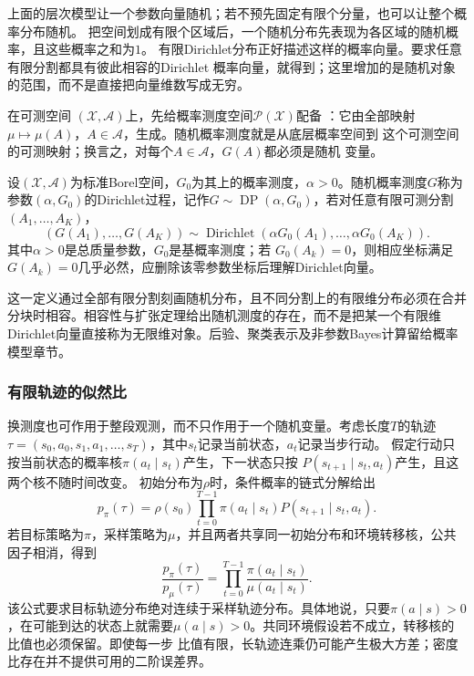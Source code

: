 上面的层次模型让一个参数向量随机；若不预先固定有限个分量，也可以让整个概率分布随机。
把空间划成有限个区域后，一个随机分布先表现为各区域的随机概率，且这些概率之和为$1$。
有限Dirichlet分布正好描述这样的概率向量。要求任意有限分割都具有彼此相容的Dirichlet
概率向量，就得到；这里增加的是随机对象的范围，而不是直接把向量维数写成无穷。
\begin{definition}[随机概率测度]
  \label{def:probability-random-probability-measure}
在可测空间
\((\mathcal X,\mathcal A)\)上，先给概率测度空间\(\mathcal P(\mathcal X)\)配备
：它由全部映射
\(\mu\mapsto\mu(A)\)，\(A\in\mathcal A\)，生成。随机概率测度就是从底层概率空间到
这个可测空间的可测映射；换言之，对每个\(A\in\mathcal A\)，\(G(A)\)都必须是随机
变量。
\end{definition}
\begin{definition}[Dirichlet过程]
  \label{def:probability-dirichlet-process}
  设\((\mathcal X,\mathcal A)\)为标准Borel空间，\(G_0\)为其上的概率测度，\(\alpha>0\)。随机概率测度\(G\)称为参数\((\alpha,G_0)\)的Dirichlet过程，记作\(G\sim\operatorname{DP}(\alpha,G_0)\)，若对任意有限可测分割
\((A_1,\ldots,A_K)\)，
\[ (G(A_1),\ldots,G(A_K))
  \sim\operatorname{Dirichlet}(\alpha G_0(A_1),\ldots,\alpha G_0(A_K)). \]
其中\(\alpha>0\)是总质量参数，\(G_0\)是基概率测度；若
\(G_0(A_k)=0\)，则相应坐标满足\(G(A_k)=0\)几乎必然，应删除该零参数坐标后理解Dirichlet向量。
\end{definition}
这一定义通过全部有限分割刻画随机分布，且不同分割上的有限维分布必须在合并分块时相容。相容性与扩张定理给出随机测度的存在，而不是把某一个有限维Dirichlet向量直接称为无限维对象。后验、聚类表示及非参数Bayes计算留给概率模型章节。

\subsubsection{有限轨迹的似然比}

换测度也可作用于整段观测，而不只作用于一个随机变量。考虑长度\(T\)的轨迹
\(\tau=(s_0,a_0,s_1,a_1,\ldots,s_T)\)，其中\(s_t\)记录当前状态，\(a_t\)记录当步行动。
假定行动只按当前状态的概率核\(\pi(a_t\mid s_t)\)产生，下一状态只按
\(P(s_{t+1}\mid s_t,a_t)\)产生，且这两个核不随时间改变。
初始分布为\(\rho\)时，条件概率的链式分解给出
\[ p_\pi(\tau)
  =\rho(s_0)\prod_{t=0}^{T-1}\pi(a_t\mid s_t)P(s_{t+1}\mid s_t,a_t). \]
若目标策略为\(\pi\)，采样策略为\(\mu\)，并且两者共享同一初始分布和环境转移核，公共因子相消，得到
\begin{equation}
  \frac{p_\pi(\tau)}{p_\mu(\tau)}
  =
  \prod_{t=0}^{T-1}
  \frac{\pi(a_t\mid s_t)}{\mu(a_t\mid s_t)}.
  \label{eq:probability-trajectory-likelihood-ratio}
\end{equation}
该公式要求目标轨迹分布绝对连续于采样轨迹分布。具体地说，只要\(\pi(a\mid s)>0\)，在可能到达的状态上就需要\(\mu(a\mid s)>0\)。共同环境假设若不成立，转移核的比值也必须保留。即使每一步
比值有限，长轨迹连乘仍可能产生极大方差；密度比存在并不提供可用的二阶误差界。

